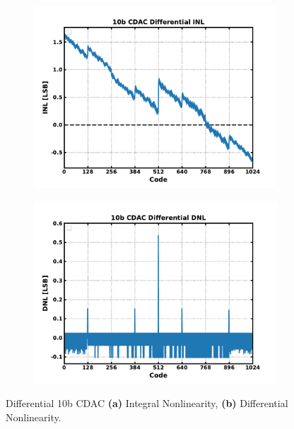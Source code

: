 	\begin{figure}[htb!]
	    \centering
	    \begin{subfigure}{0.5\textwidth}
	        \centering
	        \includegraphics[width=1\textwidth, angle=0]{./figs/results/10b_cdac_diff_inl}
	        \caption{ }
	        \label{fig:10b_cdac_diff_inl}
	    \end{subfigure}%
	    \begin{subfigure}{0.5\textwidth}
	        \centering
	        \includegraphics[width=1\textwidth, angle=0]{./figs/results/10b_cdac_diff_dnl}
	        \caption{ }
	        \label{fig:10b_cdac_diff_dnl}
	    \end{subfigure}
	    \label{fig:10b_cdac_diff_nonlinearity}
	    \caption{Differential 10b CDAC \textbf{(a)} Integral Nonlinearity, \textbf{(b)} Differential Nonlinearity.}
	\end{figure} 

